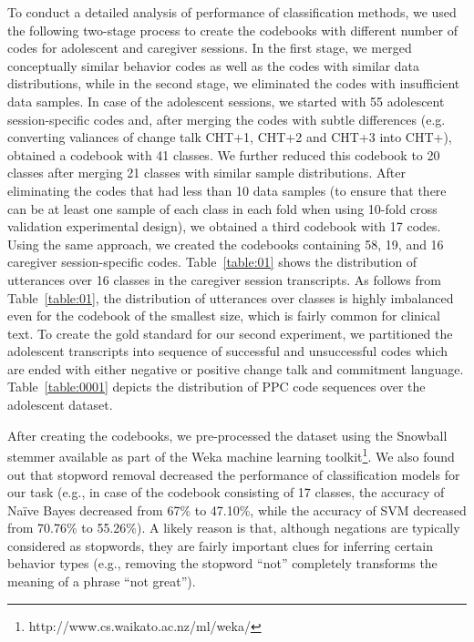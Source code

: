 \documentclass{amia}
\begin{document}
To conduct a detailed analysis of performance of classification methods, we used the following two-stage process to create the codebooks with different number of codes for
adolescent and caregiver sessions. In the first stage, we merged conceptually similar behavior codes as well as the codes with similar data distributions, while in the second stage, we eliminated the codes with insufficient data samples. In case of the adolescent sessions, we started with 55 adolescent session-specific codes and, after merging the codes with subtle differences (e.g. converting valiances of change talk CHT+1, CHT+2 and CHT+3 into CHT+), obtained a codebook with 41 classes. We further reduced this codebook to 20 classes after merging 21 classes with similar sample distributions. After eliminating the codes that had less than 10 data samples (to ensure that there can be at least one sample of each class in each fold when using 10-fold cross validation experimental design), we obtained a third codebook with 17 codes. Using the same approach, we created the codebooks containing 58, 19, and 16 caregiver session-specific codes. Table~\ref{table:01} shows the distribution of utterances over 16 classes in the caregiver session transcripts. As follows from Table~\ref{table:01}, the distribution of utterances over classes is highly imbalanced even for the codebook of the smallest size, which is fairly common for clinical text. To create the gold standard for our second experiment, we partitioned the adolescent transcripts into sequence of successful and unsuccessful codes which are ended with either negative or positive change talk and commitment language. Table~\ref{table:0001} depicts the distribution of PPC code sequences over the adolescent dataset.

After creating the codebooks, we pre-processed the dataset using the Snowball stemmer available as part of the Weka \citep{26} machine learning toolkit\footnote{
http://www.cs.waikato.ac.nz/ml/weka/}. We also found out that stopword removal decreased the performance of classification models for our task (e.g., in case of the codebook
consisting of 17 classes, the accuracy of Na\"{i}ve Bayes decreased from 67\% to 47.10\%, while the accuracy of SVM decreased from 70.76\% to 55.26\%). A likely reason is that,
although negations are typically considered as stopwords, they are fairly important clues for inferring certain behavior types (e.g., removing the stopword ``not'' completely
transforms the meaning of a phrase ``not great'').
\end{document}
